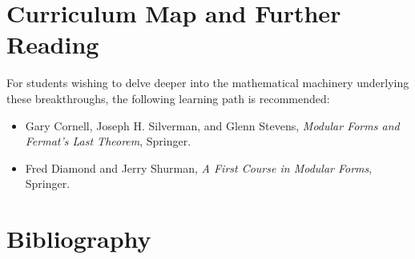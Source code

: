 \section{Curriculum Map and Further Reading}
For students wishing to delve deeper into the mathematical machinery underlying these breakthroughs, the following learning path is recommended:
\begin{itemize}
  \item Gary Cornell, Joseph H. Silverman, and Glenn Stevens, \emph{Modular Forms and Fermat's Last Theorem}, Springer.
  \item Fred Diamond and Jerry Shurman, \emph{A First Course in Modular Forms}, Springer.
\end{itemize}

\section*{Bibliography}
